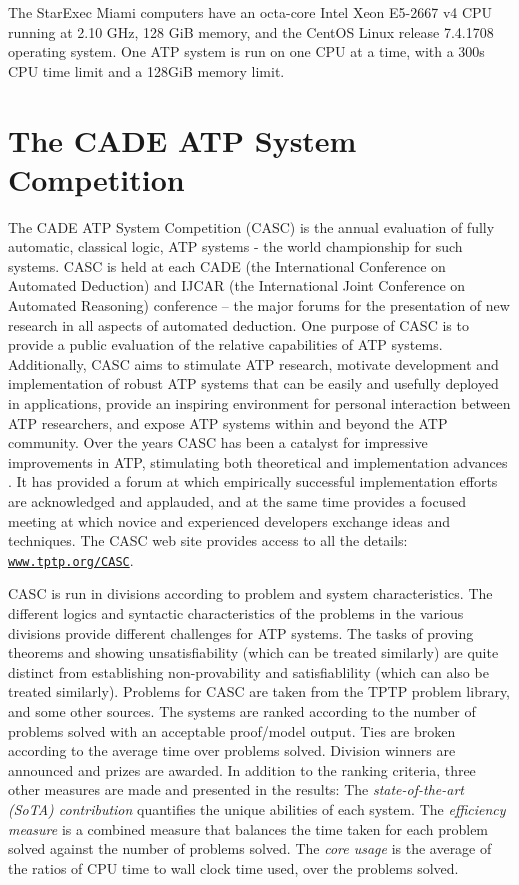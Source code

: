 \documentclass{easychair}
\begin{document}
The StarExec Miami computers have an
octa-core Intel Xeon E5-2667 v4 CPU running at 2.10 GHz,
128 GiB memory,
and the CentOS Linux release 7.4.1708 operating system.
One ATP system is run on one CPU at a time, with a 300s CPU time limit and a 128GiB memory
limit.

\section{The CADE ATP System Competition}
\label{CASC}

The CADE ATP System Competition (CASC) \cite{Sut16} is the annual evaluation of fully automatic,
classical logic, ATP systems - the world championship for such systems.
CASC is held at each CADE (the International Conference on Automated Deduction) and IJCAR
(the International Joint Conference on Automated Reasoning) conference -- the major forums
for the presentation of new research in all aspects of automated deduction.
One purpose of CASC is to provide a public evaluation of the relative capabilities of ATP systems.
Additionally, CASC aims to
stimulate ATP research,
motivate development and implementation of robust ATP systems that can be easily and usefully
deployed in applications,
provide an inspiring environment for personal interaction between ATP researchers,
and
expose ATP systems within and beyond the ATP community.
Over the years CASC has been a catalyst for impressive improvements in ATP, stimulating both 
theoretical and implementation advances \cite{Nie02-Paper}.
It has provided a forum at which empirically successful implementation efforts are acknowledged 
and applauded, and at the same time provides a focused meeting at which novice and experienced 
developers exchange ideas and techniques. 
The CASC web site provides access to all the details:
\href{http://www.tptp.org/CASC/}{{\tt www.tptp.org/CASC}}.

CASC is run in divisions according to problem and system characteristics. 
The different logics and syntactic characteristics of the problems in the various divisions 
provide different challenges for ATP systems. 
The tasks of proving theorems and showing unsatisfiability (which can be treated similarly) are 
quite distinct from establishing non-provability and satisfiablility (which can also be treated 
similarly).
Problems for CASC are taken from the TPTP problem library, and some other sources. 
The systems are ranked according to the number of problems solved with an acceptable proof/model 
output.
Ties are broken according to the average time over problems solved.
Division winners are announced and prizes are awarded.
In addition to the ranking criteria, three other measures are made and
presented in the results:
The {\em state-of-the-art (SoTA) contribution} quantifies the unique
abilities of each system.
The {\em efficiency measure} is a combined measure that balances the time
taken for each problem solved against the number of problems solved.
The {\em core usage} is the average of the ratios of CPU time to
wall clock time used, over the problems solved.
\end{document}
